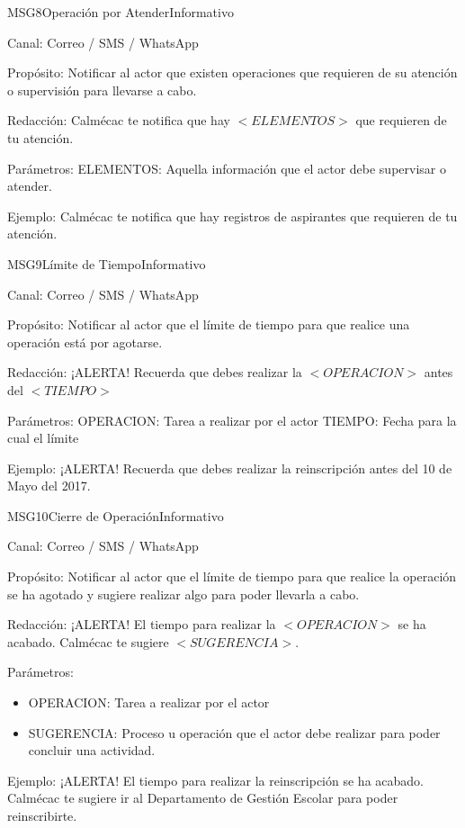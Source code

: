 
\begin{mensaje}{MSG8}{Operación por Atender}{Informativo }
	\item[Canal:] Correo / SMS / WhatsApp
	\item[Propósito:] Notificar al actor que existen operaciones que requieren de su atención o supervisión para llevarse a cabo.
	\item[Redacción:]Calmécac te notifica que hay $<ELEMENTOS>$ que requieren de tu atención.
	\item[Parámetros:]ELEMENTOS: Aquella información que el actor debe supervisar o atender.
	\item[Ejemplo:] Calmécac te notifica que hay registros de aspirantes que requieren de tu atención.
		
\end{mensaje}


\begin{mensaje}{MSG9}{Límite de Tiempo}{Informativo }
	\item[Canal:] Correo / SMS / WhatsApp
	\item[Propósito:] Notificar al actor que el límite de tiempo para que realice una operación está por agotarse.
	\item[Redacción:]¡ALERTA! Recuerda que debes realizar la $<OPERACION>$ antes del $<TIEMPO>$
	\item[Parámetros:]OPERACION: Tarea a realizar por el actor
	TIEMPO: Fecha para la cual el límite 
	\item[Ejemplo:] ¡ALERTA! Recuerda que debes realizar la reinscripción antes del 10 de Mayo del 2017.
		
\end{mensaje}


\begin{mensaje}{MSG10}{Cierre de Operación}{Informativo}
	\item[Canal:] Correo / SMS / WhatsApp
	\item[Propósito:] Notificar al actor que el límite de tiempo para que realice la operación se ha agotado y sugiere realizar algo para poder llevarla a cabo.
	\item[Redacción:] ¡ALERTA! El tiempo para realizar la $<OPERACION>$ se ha acabado. Calmécac te sugiere $<SUGERENCIA>$.
	\item[Parámetros:] 
	\begin{itemize}
		\item OPERACION: Tarea a realizar por el actor
		\item SUGERENCIA: Proceso u operación que el actor debe realizar para poder concluir una actividad.
	\end{itemize}
	\item[Ejemplo:] ¡ALERTA! El tiempo para realizar la reinscripción se ha acabado. Calmécac te sugiere ir al Departamento de Gestión Escolar para poder reinscribirte.
	
\end{mensaje}

